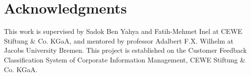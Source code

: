 \documentclass{article} %
\begin{document}
\section*{Acknowledgments}
This work is supervised by Sadok Ben Yahya and Fatih-Mehmet Inel at CEWE Stiftung \& Co. KGaA, and mentored by professor  Adalbert F.X. Wilhelm at Jacobs University Bremen. This project is established on the Customer Feedback Classification System of Corporate Information Management, CEWE Stiftung \& Co. KGaA. 



\end{document}
